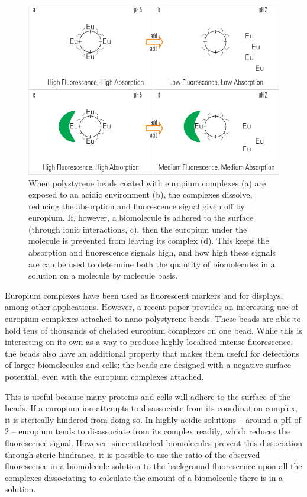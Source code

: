 \begin{figure}[t]
\begin{center}
\includegraphics[]{figures/eu_beads/eu_beads.pdf}
\end{center}
\caption[Europium Bead Protein Assay]{When polystyrene beads coated with europium complexes (a) are exposed to an acidic environment (b), the complexes dissolve, reducing the absorption and fluorescence signal given off by europium. If, however, a biomolecule is adhered to the surface (through ionic interactions, c), then the europium under the molecule is prevented from leaving its complex (d). This keeps the absorption and fluorescence signals high, and how high these signals are can be used to determine both the quantity of biomolecules in a solution on a molecule by molecule basis.}
\label{fig:eu_beads}
\end{figure}

Europium complexes have been used as fluorescent markers and for displays,
among other applications. However, a recent paper provides an interesting use
of europium complexes attached to nano polystyrene beads. These beads are able
to hold tens of thousands of chelated europium complexes on one bead. While
this is interesting on its own as a way to produce highly localised intense
fluorescence, the beads also have an additional property that makes them useful
for detections of larger biomolecules and cells: the beads are designed with a
negative surface potential, even with the europium complexes attached.

This is useful because many proteins and cells will adhere to the surface of
the beads. If a europium ion attempts to disassociate from its coordination
complex, it is sterically hindered from doing so. In highly acidic solutions --
around a pH of 2 -- europium tends to disassociate from its complex readily,
which reduces the fluorescence signal. However, since attached biomolecules
prevent this dissociation through steric hindrance, it is possible to use the
ratio of the observed fluorescence in a biomolecule solution to the background
fluorescence upon all the complexes dissociating to calculate the amount of a
biomolecule there is in a solution.

